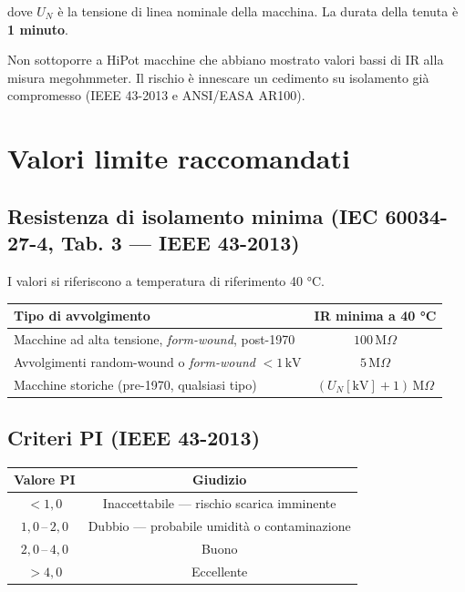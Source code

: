 \documentclass[a4paper,11pt]{article}
\begin{document}
dove $U_N$ è la tensione di linea nominale della macchina. La durata della tenuta è \textbf{1 minuto}.

\begin{notabox}
Non sottoporre a HiPot macchine che abbiano mostrato valori bassi di IR alla misura megohmmeter. Il rischio è innescare un cedimento su isolamento già compromesso (IEEE 43-2013 e ANSI/EASA AR100).
\end{notabox}

\section{Valori limite raccomandati}

\subsection{Resistenza di isolamento minima (IEC 60034-27-4, Tab. 3 — IEEE 43-2013)}

I valori si riferiscono a temperatura di riferimento 40 °C.

\begin{center}
\begin{tabular}{lc}
\toprule
\textbf{Tipo di avvolgimento} & \textbf{IR minima a 40 °C} \\
\midrule
Macchine ad alta tensione, \emph{form-wound}, post-1970 & $100\,\text{M}\Omega$ \\
Avvolgimenti random-wound o \emph{form-wound} $< 1\,\text{kV}$ & $5\,\text{M}\Omega$ \\
Macchine storiche (pre-1970, qualsiasi tipo) & $(U_N[\text{kV}] + 1)\,\text{M}\Omega$ \\
\bottomrule
\end{tabular}
\end{center}

\subsection{Criteri PI (IEEE 43-2013)}

\begin{center}
\begin{tabular}{cc}
\toprule
\textbf{Valore PI} & \textbf{Giudizio} \\
\midrule
$< 1{,}0$             & Inaccettabile — rischio scarica imminente \\
$1{,}0\,\text{--}\,2{,}0$ & Dubbio — probabile umidità o contaminazione \\
$2{,}0\,\text{--}\,4{,}0$ & Buono \\
$> 4{,}0$             & Eccellente \\
\bottomrule
\end{tabular}
\end{center}
\end{document}
